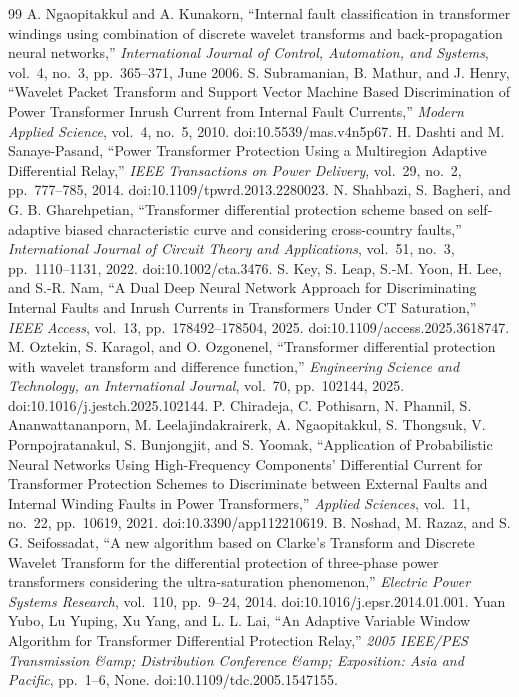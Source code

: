 \documentclass[12pt,a4paper,oneside]{report}
\begin{document}
\begin{thebibliography}{99}
 A. Ngaopitakkul and A. Kunakorn, ``Internal fault classification in transformer windings using combination of discrete wavelet transforms and back-propagation neural networks,'' \textit{International Journal of Control, Automation, and Systems}, vol.~4, no.~3, pp.~365--371, June 2006.
 S. Subramanian, B. Mathur, and J. Henry, ``Wavelet Packet Transform and Support Vector Machine Based Discrimination of Power Transformer Inrush Current from Internal Fault Currents,'' \textit{Modern Applied Science}, vol.~4, no.~5, 2010. doi:10.5539/mas.v4n5p67.
 H. Dashti and M. Sanaye-Pasand, ``Power Transformer Protection Using a Multiregion Adaptive Differential Relay,'' \textit{IEEE Transactions on Power Delivery}, vol.~29, no.~2, pp.~777--785, 2014. doi:10.1109/tpwrd.2013.2280023.
 N. Shahbazi, S. Bagheri, and G. B. Gharehpetian, ``Transformer differential protection scheme based on self-adaptive biased characteristic curve and considering cross-country faults,'' \textit{International Journal of Circuit Theory and Applications}, vol.~51, no.~3, pp.~1110--1131, 2022. doi:10.1002/cta.3476.
 S. Key, S. Leap, S.-M. Yoon, H. Lee, and S.-R. Nam, ``A Dual Deep Neural Network Approach for Discriminating Internal Faults and Inrush Currents in Transformers Under CT Saturation,'' \textit{IEEE Access}, vol.~13, pp.~178492--178504, 2025. doi:10.1109/access.2025.3618747.
 M. Oztekin, S. Karagol, and O. Ozgonenel, ``Transformer differential protection with wavelet transform and difference function,'' \textit{Engineering Science and Technology, an International Journal}, vol.~70, pp.~102144, 2025. doi:10.1016/j.jestch.2025.102144.
 P. Chiradeja, C. Pothisarn, N. Phannil, S. Ananwattananporn, M. Leelajindakrairerk, A. Ngaopitakkul, S. Thongsuk, V. Pornpojratanakul, S. Bunjongjit, and S. Yoomak, ``Application of Probabilistic Neural Networks Using High-Frequency Components' Differential Current for Transformer Protection Schemes to Discriminate between External Faults and Internal Winding Faults in Power Transformers,'' \textit{Applied Sciences}, vol.~11, no.~22, pp.~10619, 2021. doi:10.3390/app112210619.
 B. Noshad, M. Razaz, and S. G. Seifossadat, ``A new algorithm based on Clarke's Transform and Discrete Wavelet Transform for the differential protection of three-phase power transformers considering the ultra-saturation phenomenon,'' \textit{Electric Power Systems Research}, vol.~110, pp.~9--24, 2014. doi:10.1016/j.epsr.2014.01.001.
 Yuan Yubo, Lu Yuping, Xu Yang, and L. L. Lai, ``An Adaptive Variable Window Algorithm for Transformer Differential Protection Relay,'' \textit{2005 IEEE/PES Transmission \&amp; Distribution Conference \&amp; Exposition: Asia and Pacific}, pp.~1--6, None. doi:10.1109/tdc.2005.1547155.

\end{thebibliography}
\end{document}
